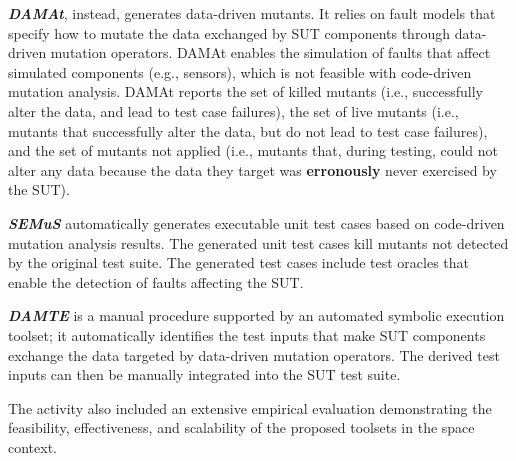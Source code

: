 \documentclass[a4paper]{report}
\begin{document}
\textbf{\emph{DAMAt}}, instead, generates data-driven mutants. 
It relies on fault models that specify how to mutate the data exchanged by SUT components through data-driven mutation operators. 
DAMAt enables the simulation of faults that affect simulated components (e.g., sensors), which is not feasible with code-driven mutation analysis. 
DAMAt reports the set of killed mutants (i.e., successfully alter the data, and lead to test case failures), the set of live mutants (i.e., mutants that successfully alter the data, but do not lead to test case failures), and the set of mutants not applied (i.e., mutants that, during testing, could not alter any data because the data they target was \textbf{erronously} never exercised by the SUT). 

\textbf{\emph{SEMuS}} automatically generates executable unit test cases based on code-driven mutation analysis results. The generated unit test cases kill mutants not detected by the original test suite. The generated test cases include test oracles that enable the detection of faults affecting the SUT.


\textbf{\emph{DAMTE}} is a manual procedure supported by an automated symbolic execution toolset; it automatically identifies the test inputs that make SUT components exchange the data targeted by data-driven mutation operators. The derived test inputs can then be manually integrated into the SUT test suite.
 
The activity also included an extensive empirical evaluation demonstrating the feasibility, effectiveness, and scalability of the proposed toolsets in the space context.
\end{document}
